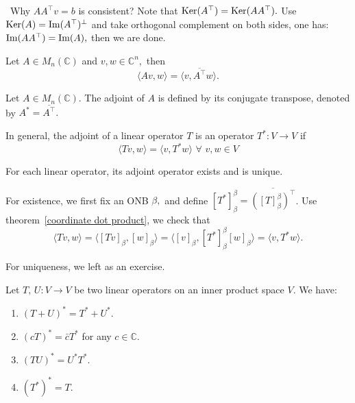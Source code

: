 \begin{remark}\
Why $AA^\top v=b$ is consistent?
Note that $\operatorname{Ker}(A^\top)=\operatorname{Ker}(AA^\top).$ 
Use $\operatorname{Ker}(A)=\operatorname{Im}(A^\top)^\perp$ and take orthogonal complement on both sides, one has:
$\operatorname{Im}(AA^\top)=\operatorname{Im}(A),$ then we are done.
\end{remark}

\begin{theorem}
    Let $A\in M_n(\mathbb{C})$ and $v,w\in\mathbb{C}^n,$ then
    $$\langle Av,w\rangle = \langle v, \overline{A^\top}w\rangle.$$
\end{theorem}

\begin{definition}
    Let $A\in M_n(\mathbb{C}).$ The adjoint of $A$ is defined by its conjugate transpose,
    denoted by $A^*=\overline{A^\top}.$

    In general, the adjoint of a linear operator $T$ is an operator $T^*:V\to V$ if
    \[\langle Tv,w\rangle = \langle v, T^*w\rangle\,\,\forall\,\, v,w\in V\]
\end{definition}

\begin{theorem}
    For each linear operator, its adjoint operator exists and is unique.
\end{theorem}

\begin{pfbox}
    For existence, we first fix an ONB $\beta,$ and define $[T^*]^\beta_{\beta} = \overline{([T]^\beta_{\beta})^\top}$.
    Use theorem~\eqref{coordinate dot product}, we check that 
    $$\langle Tv,w\rangle = \langle [Tv]_\beta,[w]_\beta\rangle = \langle [v]_\beta, [T^*]^\beta_{\beta}[w]_\beta\rangle = \langle v, T^*w\rangle.$$

    For uniqueness, we left as an exercise.
\end{pfbox}


\begin{theorem}
    Let $T,\,U:V\to V$ be two linear operators on an inner product space $V$. We have:
    \begin{enumerate}
        \item $(T+U)^* = T^* + U^*.$
        \item $(cT)^*=\bar{c}T^*$ for any $c\in\mathbb{C}.$
        \item $(TU)^* = U^*T^*.$
        \item $(T^*)^* = T.$
    \end{enumerate}
\end{theorem}

